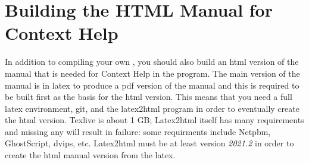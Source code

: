 \section{Building the HTML Manual for Context Help}%
\label{sec:building_the_manual}

In addition to compiling your own \CGG{}, you should also build an html version of the manual that is needed for Context Help in the program. The main version of the manual is in latex to produce a pdf version of the manual and this is required to be built first as the basis for the html version. This means that you need a full latex environment, git, and the latex2html program in order to eventually create the html version. Texlive is about 1 GB; Latex2html itself has many requirements and missing any will result in failure: some requirments include Netpbm, GhostScript, dvips, etc.  Latex2html must be at least version \textit{2021.2} in order to create the html manual version from the latex.

